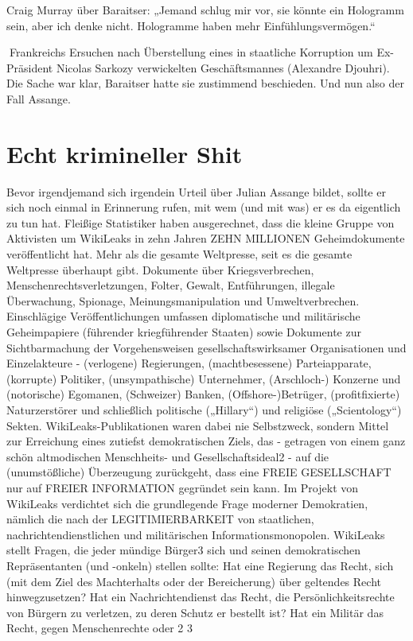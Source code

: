 \begin{multicols}{2}
Craig Murray über Baraitser: „Jemand schlug mir vor, sie könnte ein Hologramm sein, aber ich denke nicht. Hologramme haben mehr Einfühlungsvermögen.“

Frankreichs Ersuchen nach Überstellung eines in staatliche Korruption um Ex-Präsident Nicolas Sarkozy verwickelten Geschäftsmannes (Alexandre Djouhri). Die
Sache war klar, Baraitser hatte sie zustimmend beschieden.
Und nun also der Fall Assange.


\chapter{Echt krimineller Shit} %
Bevor irgendjemand sich irgendein Urteil über Julian
Assange bildet, sollte er sich noch einmal in Erinnerung
rufen, mit wem (und mit was) er es da eigentlich zu tun
hat.
Fleißige Statistiker haben ausgerechnet, dass die kleine Gruppe von Aktivisten um WikiLeaks in zehn Jahren
ZEHN MILLIONEN Geheimdokumente veröffentlicht
hat. Mehr als die gesamte Weltpresse, seit es die gesamte
Weltpresse überhaupt gibt. Dokumente über Kriegsverbrechen, Menschenrechtsverletzungen, Folter, Gewalt,
Entführungen, illegale Überwachung, Spionage, Meinungsmanipulation und Umweltverbrechen.
Einschlägige Veröffentlichungen umfassen diplomatische und militärische Geheimpapiere (führender kriegführender Staaten) sowie Dokumente zur Sichtbarmachung der Vorgehensweisen gesellschaftswirksamer
Organisationen und Einzelakteure - (verlogene) Regierungen, (machtbesessene) Parteiapparate, (korrupte)
Politiker, (unsympathische) Unternehmer, (Arschloch-)
Konzerne und (notorische) Egomanen, (Schweizer)
Banken, (Offshore-)Betrüger, (profitfixierte) Naturzerstörer und schließlich politische („Hillary“) und religiöse
(„Scientology“) Sekten. WikiLeaks-Publikationen waren
dabei nie Selbstzweck, sondern Mittel zur Erreichung
eines zutiefst demokratischen Ziels, das - getragen von
einem ganz schön altmodischen Menschheits- und Gesellschaftsideal2 - auf die (unumstößliche) Überzeugung
zurückgeht, dass eine FREIE GESELLSCHAFT nur auf
FREIER INFORMATION gegründet sein kann.
Im Projekt von WikiLeaks verdichtet sich die grundlegende Frage moderner Demokratien, nämlich die nach
der LEGITIMIERBARKEIT von staatlichen, nachrichtendienstlichen und militärischen Informationsmonopolen.
WikiLeaks stellt Fragen, die jeder mündige Bürger3 sich
und seinen demokratischen Repräsentanten (und -onkeln) stellen sollte: Hat eine Regierung das Recht, sich
(mit dem Ziel des Machterhalts oder der Bereicherung)
über geltendes Recht hinwegzusetzen? Hat ein Nachrichtendienst das Recht, die Persönlichkeitsrechte von
Bürgern zu verletzen, zu deren Schutz er bestellt ist?
Hat ein Militär das Recht, gegen Menschenrechte oder
2
3


\end{multicols}
